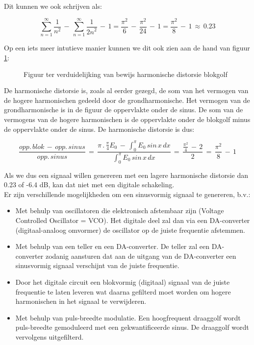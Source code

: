 Dit kunnen we ook schrijven als:

\begin{equation}
\sum\limits_{n=1}^{\infty} \frac 1{{n}^2}
\,-\,
\sum\limits_{n=1}^{\infty} \frac 1{{2n}^2}
\,-\,1
=
\frac{\pi^2}{6}\,-\,\frac{\pi^2}{24}\,-\,1
=
\frac{\pi^2}{8}\,-\,1
\,\approx \, 0.23 
\end{equation}

Op een iets meer intu{\ii}tieve manier kunnen we dit ook zien aan de hand van figuur \ref{sinharm}:

\begin{figure}[bth]
\centerline{}
\caption{Figuur ter verduidelijking van bewijs harmonische distorsie blokgolf}
\label{sinharm}
\end{figure}

De harmonische distorsie is, zoals al eerder gezegd, de som van het vermogen van de hogere harmonischen gedeeld door de grondharmonische. Het vermogen van de grondharmonische is in de figuur de oppervlakte onder de sinus. De som van de vermogens van de hogere harmonischen is de oppervlakte onder de blokgolf minus de oppervlakte onder de sinus. De harmonische distorsie is dus:

\begin{equation}
\frac{opp.\,blok\,-\,opp.\,sinus}{opp.\,sinus}
\,=\,
\frac{
\pi\,.\,\frac{\pi}{4}E_{0}\,-\, 
\int_0^\pi E_{0}\,sin\,x\,dx}
{\int_0^\pi E_{0}\,sin\,x\,dx}
\,=\,
\frac{\frac{\pi^2}{4}\,-\,2}{2}
\,=\,
\frac{\pi^2}{8}\,-\,1
\end{equation}

Als we dus een signaal willen genereren met een lagere harmonische distorsie dan 0.23 of -6.4 dB, kan dat niet met een digitale schakeling.\\
Er zijn verschillende mogelijkheden om een sinusvormig signaal te genereren,
b.v.:
\begin{itemize}
\item
Met behulp van oscillatoren die elektronisch afstembaar zijn (Voltage Controlled Oscillator = VCO).
Het digitale deel zal dan via een DA-converter (digitaal-analoog omvormer) de oscillator op de juiste frequentie afstemmen.
\item
Met behulp van een teller en een DA-converter.
De teller zal een DA-converter zodanig aan\-sturen dat aan de uitgang van de DA-converter een sinusvormig signaal verschijnt van de juiste frequentie.
\item
Door het digitale circuit een blokvormig (digitaal) signaal van de juiste frequentie te laten le\-veren wat daarna gefilterd moet worden om hogere harmonischen in het signaal te verwijderen.
\item
Met behulp van puls-breedte modulatie. Een hoogfrequent draaggolf wordt puls-breedte gemoduleerd met een gekwantificeerde sinus. De draaggolf wordt vervolgens uitgefilterd.
\end{itemize}
